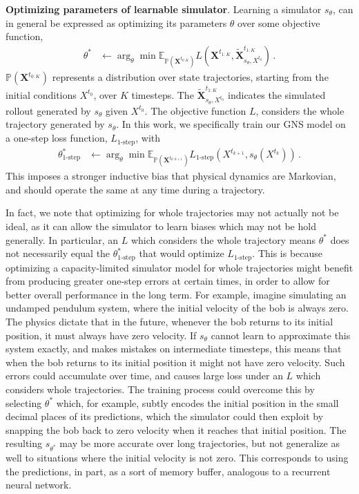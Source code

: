 \documentclass{article}
\newcommand{\xhdr}[1]{{\noindent\bfseries #1}.}
\newcommand{\simulator}{s}
\begin{document}
\xhdr{Optimizing parameters of learnable simulator}
Learning a simulator $\simulator_\theta$, can in general be expressed as optimizing its parameters $\theta$ over some objective function,
\begin{align*}
    \theta^* &\leftarrow \arg_\theta\min \mathbb{E}_{\mathbb{P}(\mathbf{X}^{t_{0:K}})} L(\mathbf{X}^{t_{1:K}}, \tilde{\mathbf{X}}^{t_{1:K}}_{\simulator_\theta, X^{t_0}})\,.
\end{align*}
${\mathbb{P}(\mathbf{X}^{t_{0:K}})}$ represents a distribution over state trajectories, starting from the initial conditions $X^{t_0}$, over $K$ timesteps.
%
The $\tilde{\mathbf{X}}^{t_{1:K}}_{\simulator_\theta, X^{t_0}}$ indicates the simulated rollout generated by $\simulator_\theta$ given $X^{t_0}$.
%
The objective function $L$, considers the whole trajectory generated by $\simulator_\theta$.
%
In this work, we specifically train our GNS model on a one-step loss function, $L_{\text{1-step}}$, with
\begin{align*}
\theta^*_{\text{1-step}} &\leftarrow \arg_\theta\min \mathbb{E}_{\mathbb{P}(\mathbf{X}^{t_{k:k+1}})} L_{\text{1-step}}(X^{t_{k+1}}, s_\theta(X^{t_k}))\,.
\end{align*}
This imposes a stronger inductive bias that physical dynamics are Markovian, and should operate the same at any time during a trajectory.

In fact, we note that optimizing for whole trajectories may not actually not be ideal, as it can allow the simulator to learn biases which may not be hold generally. In particular, an $L$ which considers the whole trajectory means $\theta^*$ does not necessarily equal the $\theta^*_{\text{1-step}}$ that would optimize $L_{\text{1-step}}$.
%
This is because optimizing a capacity-limited simulator model for whole trajectories might benefit from producing greater one-step errors at certain times, in order to allow for better overall performance in the long term. For example, imagine simulating an undamped pendulum system, where the initial velocity of the bob is always zero. The physics dictate that in the future, whenever the bob returns to its initial position, it must always have zero velocity. If $\simulator_\theta$ cannot learn to approximate this system exactly, and makes mistakes on intermediate timesteps, this means that when the bob returns to its initial position it might not have zero velocity. Such errors could accumulate over time, and causes large loss under an $L$ which considers whole trajectories. The training process could overcome this by selecting $\theta^*$ which, for example, subtly encodes the initial position in the small decimal places of its predictions, which the simulator could then exploit by snapping the bob back to zero velocity when it reaches that initial position. The resulting $\simulator_{\theta^*}$ may be more accurate over long trajectories, but not generalize as well to situations where the initial velocity is not zero. This corresponds to using the predictions, in part, as a sort of memory buffer, analogous to a recurrent neural network.
\end{document}
